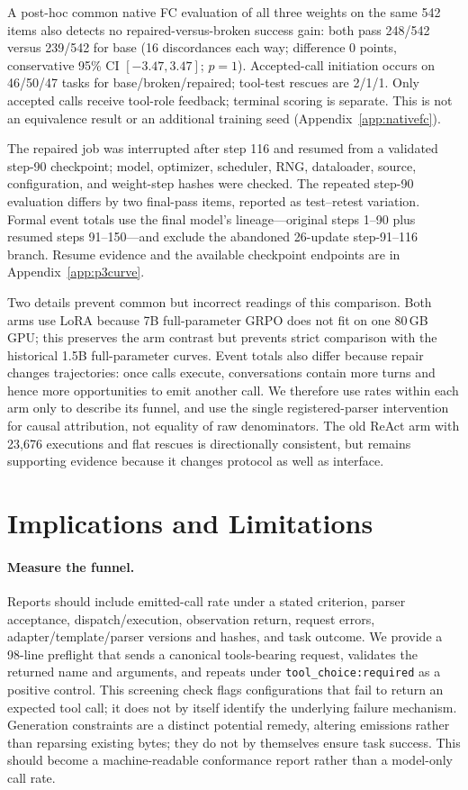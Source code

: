 A post-hoc common native FC evaluation of all three weights on the same 542 items
also detects no repaired-versus-broken success gain: both pass 248/542 versus 239/542
for base (16 discordances each way; difference 0 points, conservative 95\% CI
$[-3.47,3.47]$; $p=1$). Accepted-call initiation occurs on 46/50/47 tasks for base/broken/repaired;
tool-test rescues are 2/1/1. Only accepted calls receive tool-role feedback; terminal scoring
is separate. This is not an equivalence result or an additional training seed
(Appendix~\ref{app:nativefc}).

The repaired job was interrupted after step 116 and
resumed from a validated step-90 checkpoint; model, optimizer, scheduler, RNG, dataloader, source,
configuration, and weight-step hashes were checked. The repeated step-90 evaluation differs by
two final-pass items, reported as test--retest variation. Formal event totals use the final model's
lineage---original steps 1--90 plus resumed steps 91--150---and exclude the abandoned 26-update
step-91--116 branch. Resume evidence and the available checkpoint endpoints are in
Appendix~\ref{app:p3curve}.

Two details prevent common but incorrect readings of this comparison. Both arms use LoRA because
7B full-parameter GRPO does not fit on one 80\,GB GPU; this preserves the arm contrast but prevents
strict comparison with the historical 1.5B full-parameter curves. Event totals also differ because
repair changes trajectories: once calls execute, conversations contain more turns and hence more
opportunities to emit another call. We therefore use rates within each arm only to describe its
funnel, and use the single registered-parser intervention for causal attribution, not equality of
raw denominators. The old ReAct arm with 23,676 executions and flat rescues is directionally
consistent, but remains supporting evidence because it changes protocol as well as interface.

\section{Implications and Limitations}
\label{sec:discussion}
\label{sec:limitations}
\label{sec:future}

\paragraph{Measure the funnel.} Reports should include emitted-call rate under a stated criterion,
parser acceptance, dispatch/execution, observation return, request errors, adapter/template/parser
versions and hashes, and task outcome. We provide a 98-line preflight that sends a canonical
tools-bearing request, validates the returned name and arguments, and repeats under
\texttt{tool\_choice:required} as a positive control. This screening check flags configurations
that fail to return an expected tool call; it does not by itself identify the underlying
failure mechanism. Generation constraints are a distinct potential remedy, altering emissions rather than
reparsing existing bytes; they do not by themselves ensure task success. This should become a machine-readable conformance report rather than a model-only call rate.


